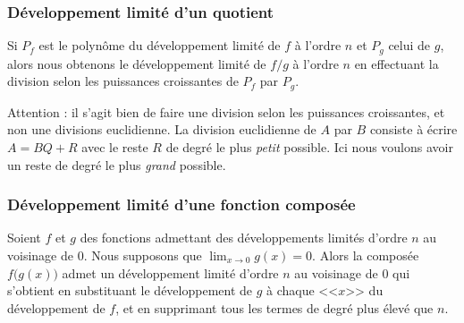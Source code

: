 \newcommand{\CaptionFigWUYooCISzeB}{Les développements limités d'ordre de plus en plus grand de la fonction de l'exemple~\ref{ExKPBooJmdFvY}. La fonction est en bleu et les «approximations» sont en rouge.}


\subsubsection{Développement limité d'un quotient}

\begin{proposition}     \label{PROPooMANAooXhuanS}
	Si \( P_f\) est le polynôme du développement limité de \( f\) à l'ordre \( n\) et \( P_g\) celui de \( g\), alors nous obtenons le développement limité de \( f/g\) à l'ordre \( n\) en effectuant la division selon les puissances croissantes de \( P_f\) par \( P_g\).
\end{proposition}
Attention : il s'agit bien de faire une division selon les puissances croissantes, et non une divisions euclidienne. La division euclidienne de \( A\) par \( B\) consiste à écrire \( A=BQ+R\) avec le reste \( R\) de degré le plus \emph{petit} possible. Ici nous voulons avoir un reste de degré le plus \emph{grand} possible.

\subsubsection{Développement limité d'une fonction composée}


\begin{proposition}
	Soient \( f\) et \( g\) des fonctions admettant des développements limités d'ordre \( n\) au voisinage de \( 0\). Nous supposons que \( \lim_{x\to 0} g(x)=0\). Alors la composée \( f\big( g(x) \big)\) admet un développement limité d'ordre \( n\) au voisinage de \( 0\) qui s'obtient en substituant le développement de \( g\) à chaque <<\(x \)>> du développement de \( f\), et en supprimant tous les termes de degré plus élevé que \( n\).
\end{proposition}

